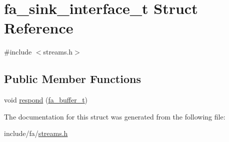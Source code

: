 \hypertarget{structfa__sink__interface__t}{\section{fa\-\_\-sink\-\_\-interface\-\_\-t Struct Reference}
\label{structfa__sink__interface__t}
}


{\ttfamily \#include $<$streams.\-h$>$}

\subsection*{Public Member Functions}
\begin{DoxyCompactItemize}
\item 
void \hyperlink{group___fa_gab40f1c0168eaa1b162eb227db230b826}{respond} (\hyperlink{group___fa_buffer_ga0ed7a1d783ab322e2e8be02432d0839e}{fa\-\_\-buffer\-\_\-t})
\end{DoxyCompactItemize}


The documentation for this struct was generated from the following file\-:\begin{DoxyCompactItemize}
\item 
include/fa/\hyperlink{streams_8h}{streams.\-h}\end{DoxyCompactItemize}
